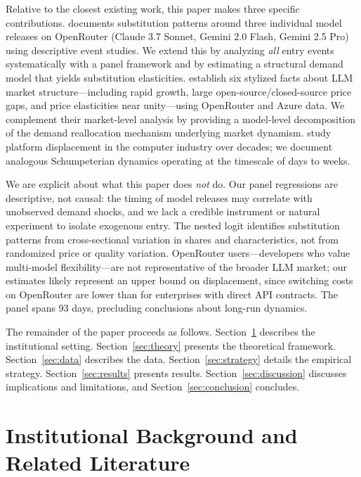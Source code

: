 \documentclass[11pt, a4paper]{article}
\begin{document}
Relative to the closest existing work, this paper makes three specific contributions. \citet{fradkin2025demand} documents substitution patterns around three individual model releases on OpenRouter (Claude 3.7 Sonnet, Gemini 2.0 Flash, Gemini 2.5 Pro) using descriptive event studies. We extend this by analyzing \emph{all} entry events systematically with a panel framework and by estimating a structural demand model that yields substitution elasticities. \citet{demirer2025emerging} establish six stylized facts about LLM market structure---including rapid growth, large open-source/closed-source price gaps, and price elasticities near unity---using OpenRouter and Azure data. We complement their market-level analysis by providing a model-level decomposition of the demand reallocation mechanism underlying market dynamism. \citet{bresnahan1999technological} study platform displacement in the computer industry over decades; we document analogous Schumpeterian dynamics operating at the timescale of days to weeks.

We are explicit about what this paper does \emph{not} do. Our panel regressions are descriptive, not causal: the timing of model releases may correlate with unobserved demand shocks, and we lack a credible instrument or natural experiment to isolate exogenous entry. The nested logit identifies substitution patterns from cross-sectional variation in shares and characteristics, not from randomized price or quality variation. OpenRouter users---developers who value multi-model flexibility---are not representative of the broader LLM market; our estimates likely represent an upper bound on displacement, since switching costs on OpenRouter are lower than for enterprises with direct API contracts. The panel spans 93 days, precluding conclusions about long-run dynamics.

The remainder of the paper proceeds as follows. Section~\ref{sec:background} describes the institutional setting. Section~\ref{sec:theory} presents the theoretical framework. Section~\ref{sec:data} describes the data. Section~\ref{sec:strategy} details the empirical strategy. Section~\ref{sec:results} presents results. Section~\ref{sec:discussion} discusses implications and limitations, and Section~\ref{sec:conclusion} concludes.

\section{Institutional Background and Related Literature}
\label{sec:background}
\end{document}
